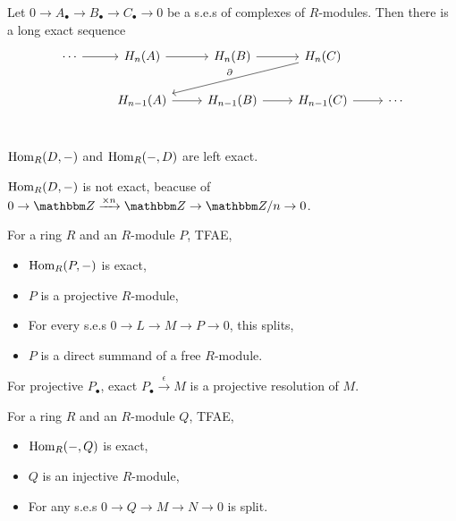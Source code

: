 \documentclass{article}
\begin{document}
\begin{theorem}
  Let \(0 \to A_\bullet \to B_\bullet \to C_\bullet \to 0\)
  be a s.e.s of complexes of \(R\)-modules.
  Then there is a long exact sequence
  \[\begin{tikzcd}
    \cdots \ar{r} & H_n(A) \ar{r} & H_n(B) \ar{r} & H_n(C) \ar[swap, "\partial"]{lld} \\
    & H_{n-1}(A) \ar{r} & H_{n-1}(B) \ar{r} & H_{n-1}(C) \ar{r} & \cdots \\
  \end{tikzcd}\]
\end{theorem}

\begin{theorem}
  \(\textnormal{Hom}_R(D, -)\) and \(\textnormal{Hom}_R(-, D)\) are left exact.
\end{theorem}
\begin{example}
  \(\textnormal{Hom}_R(D, -)\) is not exact, beacuse of
  \(0 \to \bbZ \xrightarrow{\times n} \bbZ \to \bbZ/n \to 0\).
\end{example}

\begin{theorem}
  For a ring \(R\) and an \(R\)-module \(P\), TFAE,
  \begin{itemize}
  \item \(\textnormal{Hom}_R(P, -)\) is exact,
  \item \(P\) is a projective \(R\)-module,
  \item For every s.e.s \(0 \to L \to M \to P \to 0\), this splits,
  \item \(P\) is a direct summand of a free \(R\)-module.
  \end{itemize}
\end{theorem}

\begin{definition}
  For projective \(P_\bullet\),
  exact \(P_\bullet \xrightarrow{\epsilon} M\) is a projective resolution of \(M\).
\end{definition}

\begin{theorem}
  For a ring \(R\) and an \(R\)-module \(Q\), TFAE,
  \begin{itemize}
  \item \(\textnormal{Hom}_R(-, Q)\) is exact,
  \item \(Q\) is an injective \(R\)-module,
  \item For any s.e.s \(0 \to Q \to M \to N \to 0\) is split.
  \end{itemize}
\end{theorem}
\end{document}
